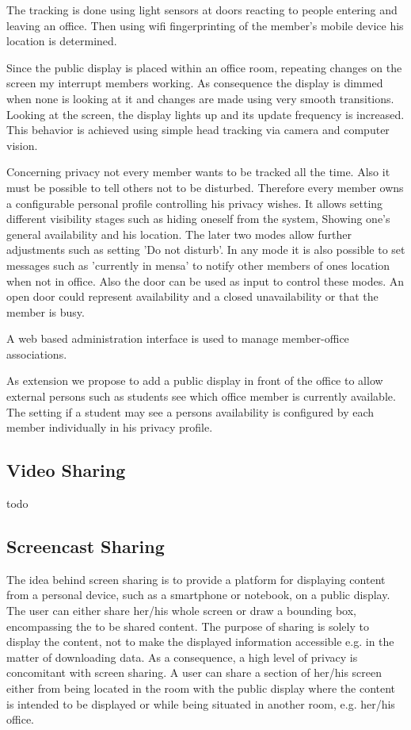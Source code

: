The tracking is done using light sensors at doors reacting to people entering and leaving an office.
Then using wifi fingerprinting of the member's mobile device his location is determined.

Since the public display is placed within an office room, repeating changes on the screen my interrupt members working.
As consequence the display is dimmed when none is looking at it and changes are made using very smooth transitions.
Looking at the screen, the display lights up and its update frequency is increased.
This behavior is achieved using simple head tracking via camera and computer vision.

Concerning privacy not every member wants to be tracked all the time.
Also it must be possible to tell others not to be disturbed.
Therefore every member owns a configurable personal profile controlling his privacy wishes.
It allows setting different visibility stages such as hiding oneself from the system,
Showing one's general availability and his location.
The later two modes allow further adjustments such as setting 'Do not disturb'.
In any mode it is also possible to set messages such as 'currently in mensa' to notify other members of ones location when not in office.
Also the door can be used as input to control these modes.
An open door could represent availability and a closed unavailability or that the member is busy.

A web based administration interface is used to manage member-office associations.

As extension we propose to add a public display in front of the office to allow external persons such as students see which office member is currently available.
The setting if a student may see a persons availability is configured by each member individually in his privacy profile.



\subsection{Video Sharing}

todo

\subsection{Screencast Sharing}

The idea behind screen sharing is to provide a platform for displaying content from a personal device, such as a smartphone or notebook, on a public display.
The user can either share her/his whole screen or draw a bounding box, encompassing the to be shared content.
The purpose of sharing is solely to display the content, not to make the displayed information accessible e.g. in the matter of downloading data.
As a consequence, a high level of privacy is concomitant with screen sharing.
A user can share a section of her/his screen either from being located in the room with the public display where the content is intended to be displayed or while being situated in another room, e.g. her/his office.

